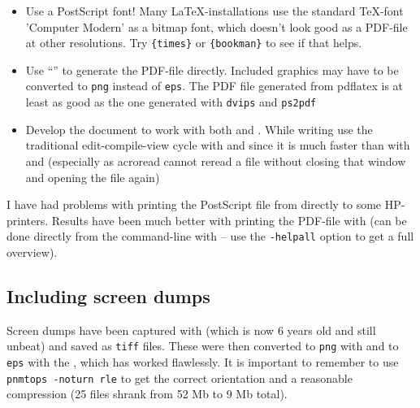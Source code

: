 \begin{itemize}
\item Use a PostScript font!  Many \LaTeX-installations use the
  standard \TeX-font 'Computer Modern' as a bitmap font, which doesn't
  look good as a PDF-file at other resolutions.   Try
  \texttt{\{times\}} or
  \texttt{\{bookman\}} to see if that helps.
\item Use ``'' to generate the PDF-file
  directly.  Included graphics may have to be converted to
  \texttt{png} instead of \texttt{eps}.  The PDF file generated from
  pdflatex is at least as good as the one generated with
  \texttt{dvips} and \texttt{ps2pdf}
\item Develop the document to work with both  and
  .  While writing use the traditional
  edit-compile-view cycle with  and
   since it is much faster than with
   and  (especially as
  acroread cannot reread a file without closing that window and
  opening the file again)
\end{itemize}

I have had problems with printing the PostScript file from
 directly to some HP-printers.  Results have been
much better with printing the PDF-file with
 (can be done directly from the command-line with
 -- use the
\texttt{-helpall} option to get a full overview).


\subsection{Including screen dumps}
\label{sec:report-writing-tools-latex-eps}

Screen dumps have been captured with
(which is now 6 years old and still unbeat) and saved as \texttt{tiff}
files.  These were then converted to \texttt{png} with
 and to \texttt{eps} with the
, which has worked flawlessly.  It is important to remember
to use \texttt{pnmtops -noturn rle} to get the correct orientation and
a reasonable compression (25 files shrank from 52 Mb to 9 Mb total).

